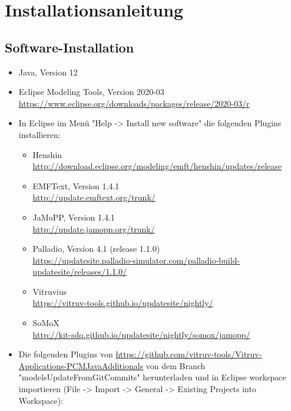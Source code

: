 \chapter{Installationsanleitung}
\label{ch:Installationsanleitung}


\section{Software-Installation}
\label{sec:Software-Installation}
\begin{itemize}
\item Java, Version 12 
\item Eclipse Modeling Tools, Version 2020-03 \\\href{https://www.eclipse.org/downloads/packages/release/2020-03/r}{https://www.eclipse.org/downloads/packages/release/2020-03/r}
\item In Eclipse im Menü "Help -> Install new software" die folgenden Plugins installieren:
	\begin{itemize}
	\item Henshin\\\href{http://download.eclipse.org/modeling/emft/henshin/updates/release}{http://download.eclipse.org/modeling/emft/henshin/updates/release} 
	\item EMFText, Version 1.4.1 \\\href{http://update.emftext.org/trunk/}{http://update.emftext.org/trunk/}
	\item JaMoPP, Version 1.4.1 \\\href{http://update.jamopp.org/trunk/}{http://update.jamopp.org/trunk/}	
	\item Palladio, Version 4.1 (release 1.1.0) \\\href{https://updatesite.palladio-simulator.com/palladio-build-updatesite/releases/1.1.0/}{https://updatesite.palladio-simulator.com/palladio-build-updatesite/releases/1.1.0/}
	\item Vitruvius \\\href{https://vitruv-tools.github.io/updatesite/nightly/}{https://vitruv-tools.github.io/updatesite/nightly/}
	\item SoMoX \\\href{http://kit-sdq.github.io/updatesite/nightly/somox/jamopp/}{http://kit-sdq.github.io/updatesite/nightly/somox/jamopp/}
	\end{itemize}
\item Die folgenden Plugins von \href{https://github.com/vitruv-tools/Vitruv-Applications-PCMJavaAdditionals}{https://github.com/vitruv-tools/Vitruv-Applications-PCMJavaAdditionals} von dem Branch "modelsUpdateFromGitCommits"  herunterladen und in Eclipse workspace importieren (File -> Import -> General -> Existing Projects into Workspace):

\end{itemize}
